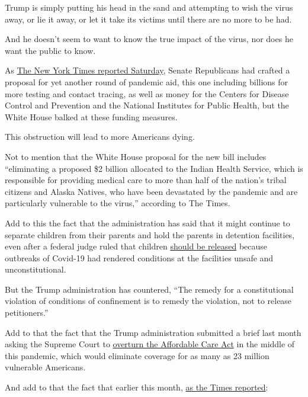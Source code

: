 Trump is simply putting his head in the sand and attempting to wish the
virus away, or lie it away, or let it take its victims until there are
no more to be had.

And he doesn't seem to want to know the true impact of the virus, nor
does he want the public to know.

As
\href{https://www.nytimes3xbfgragh.onion/2020/07/18/us/politics/trump-virus-testing-relief-congress.html}{The
New York Times reported Saturday}, Senate Republicans had crafted a
proposal for yet another round of pandemic aid, this one including
billions for more testing and contact tracing, as well as money for the
Centers for Disease Control and Prevention and the National Institutes
for Public Health, but the White House balked at these funding measures.

This obstruction will lead to more Americans dying.

Not to mention that the White House proposal for the new bill includes
``eliminating a proposed \$2 billion allocated to the Indian Health
Service, which is responsible for providing medical care to more than
half of the nation's tribal citizens and Alaska Natives, who have been
devastated by the pandemic and are particularly vulnerable to the
virus,'' according to The Times.

Add to this the fact that the administration has said that it might
continue to separate children from their parents and hold the parents in
detention facilities, even after a federal judge ruled that children
\href{https://www.washingtonpost.com/local/legal-issues/us-may-separate-families-after-federal-judge-orders-ice-to-free-migrant-children/2020/07/07/a1758ad6-c067-11ea-b178-bb7b05b94af1_story.html}{should
be released} because outbreaks of Covid-19 had rendered conditions at
the facilities unsafe and unconstitutional.

But the Trump administration has countered, ``The remedy for a
constitutional violation of conditions of confinement is to remedy the
violation, not to release petitioners.''

Add to that the fact that the Trump administration submitted a brief
last month asking the Supreme Court to
\href{https://www.nytimes3xbfgragh.onion/2020/06/26/us/politics/obamacare-trump-administration-supreme-court.html}{overturn
the Affordable Care Act} in the middle of this pandemic, which would
eliminate coverage for as many as 23 million vulnerable Americans.

And add to that the fact that earlier this month,
\href{https://www.nytimes3xbfgragh.onion/2020/07/07/us/politics/coronavirus-trump-who.html}{as
the Times reported}:

